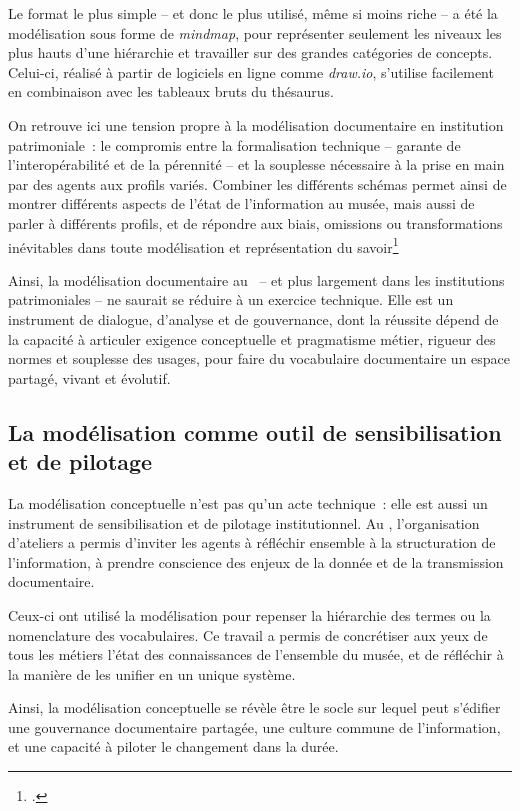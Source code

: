 Le format le plus simple -- et donc le plus utilisé, même si moins riche -- a été la modélisation sous forme de \textit{mindmap}, pour représenter seulement les niveaux les plus hauts d'une hiérarchie et travailler sur des grandes catégories de concepts. Celui-ci,  réalisé à partir de logiciels en ligne comme \textit{draw.io}, s'utilise facilement en combinaison avec les tableaux bruts du thésaurus.

On retrouve ici une tension propre à la modélisation documentaire en institution patrimoniale~: le compromis entre la formalisation technique – garante de l'interopérabilité et de la pérennité – et la souplesse nécessaire à la prise en main par des agents aux profils variés. Combiner les différents schémas permet ainsi de montrer différents aspects de l'état de l'information au musée, mais aussi de parler à différents profils, et de répondre aux biais, omissions ou transformations inévitables dans toute modélisation et représentation du savoir\footcite{bowkerArrangerChosesConsequences2023}

Ainsi, la modélisation documentaire au \mae~– et plus largement dans les institutions patrimoniales – ne saurait se réduire à un exercice technique. Elle est un instrument de dialogue, d'analyse et de gouvernance, dont la réussite dépend de la capacité à articuler exigence conceptuelle et pragmatisme métier, rigueur des normes et souplesse des usages, pour faire du vocabulaire documentaire un espace partagé, vivant et évolutif.



\subsection{La modélisation comme outil de sensibilisation et de pilotage}


La modélisation conceptuelle n’est pas qu’un acte technique~: elle est aussi un instrument de sensibilisation et de pilotage institutionnel. Au \mae, l’organisation d’ateliers a permis d’inviter les agents à réfléchir ensemble à la structuration de l’information, à prendre conscience des enjeux de la donnée et de la transmission documentaire.

Ceux-ci ont utilisé la modélisation pour repenser la hiérarchie des termes ou la nomenclature des vocabulaires. Ce travail a permis de concrétiser aux yeux de tous les métiers l'état des connaissances de l'ensemble du musée, et de réfléchir à la manière de les unifier en un unique système.

\bigskip
\bigskip
\bigskip

Ainsi, la modélisation conceptuelle se révèle être le socle sur lequel peut s’édifier une gouvernance documentaire partagée, une culture commune de l’information, et une capacité à piloter le changement dans la durée.